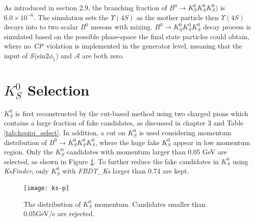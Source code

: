 As introduced in section 2.9, the branching fraction of $B^0 \to K_S^0  K_S^0  K_S^0)$ is $6.0 \times 10^{-6}$. The simulation sets the $\Upsilon(4S)$ as the mother particle then $\Upsilon(4S)$ decays into to two scalar $B^0$ mesons with mixing. $B^0 \to K_S^0  K_S^0  K_S^0$ decay process is simulated based on the possible phase-space the final state particles could obtain, where no $\it{CP}$ violation is implemented in the generator level, meaning that the input of $\mathcal{S}$(sin2$\phi_1$) and $\mathcal{A}$ are both zero. 
\section{$K_S^0$ Selection}
$K_S^0$ is first reconstructed by the cut-based method using two charged pions which contains a large fraction of fake candidates, as discussed in chapter 3 and Table \ref{tab:kspipi_select}. In addition, a cut on $K_S^0$ is used considering momentum distribution of $B^0 \to K_S^0  K_S^0  K_S^0$, where the huge fake $K_S^0$ appear in low momentum region. Only the $K_S^0$ candidates with momentum larger than 0.05 GeV are selected, as shown in Figure \ref{fig:ks-p}. To further reduce the fake candidates in $K_S^0$ using \textit{KsFinder}, only $K_S^0$ with \textit{FBDT\_Ks} larger than 0.74 are kept.
\begin{figure}[ht]
	\centering
	\texttt{[image: ks-p]}
	\caption{The distribution of $K_S^0$ momentum. Candidates smaller than 0.05GeV/c are rejected.}
	\label{fig:ks-p}
\end{figure}

